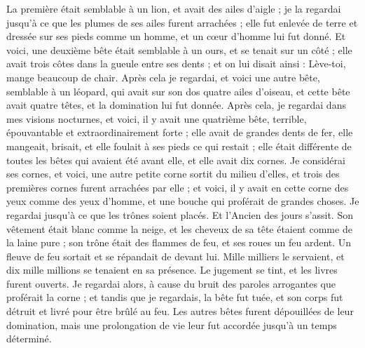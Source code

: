 \begin{multicols}{2}
La première était semblable à un lion, et avait des ailes d'aigle ; je la regardai jusqu'à ce que les plumes de ses ailes furent arrachées ; elle fut enlevée de terre et dressée sur ses pieds comme un homme, et un cœur d'homme lui fut donné.
Et voici, une deuxième bête était semblable à un ours, et se tenait sur un côté ; elle avait trois côtes dans la gueule entre ses dents ; et on lui disait ainsi : Lève-toi, mange beaucoup de chair.
Après cela je regardai, et voici une autre bête, semblable à un léopard, qui avait sur son dos quatre ailes d'oiseau, et cette bête avait quatre têtes, et la domination lui fut donnée.
Après cela, je regardai dans mes visions nocturnes, et voici, il y avait une quatrième bête, terrible, épouvantable et extraordinairement forte ; elle avait de grandes dents de fer, elle mangeait, brisait, et elle foulait à ses pieds ce qui restait ; elle était différente de toutes les bêtes qui avaient été avant elle, et elle avait dix cornes.
Je considérai ses cornes, et voici, une autre petite corne sortit du milieu d'elles, et trois des premières cornes furent arrachées par elle ; et voici, il y avait en cette corne des yeux comme des yeux d'homme, et une bouche qui proférait de grandes choses.
Je regardai jusqu'à ce que les trônes soient placés. Et l'Ancien des jours s'assit. Son vêtement était blanc comme la neige, et les cheveux de sa tête étaient comme de la laine pure ; son trône était des flammes de feu, et ses roues un feu ardent.
Un fleuve de feu sortait et se répandait de devant lui. Mille milliers le servaient, et dix mille millions se tenaient en sa présence. Le jugement se tint, et les livres furent ouverts.
Je regardai alors, à cause du bruit des paroles arrogantes que proférait la corne ; et tandis que je regardais, la bête fut tuée, et son corps fut détruit et livré pour être brûlé au feu.
Les autres bêtes furent dépouillées de leur domination, mais une prolongation de vie leur fut accordée jusqu'à un temps déterminé.

\end{multicols}
